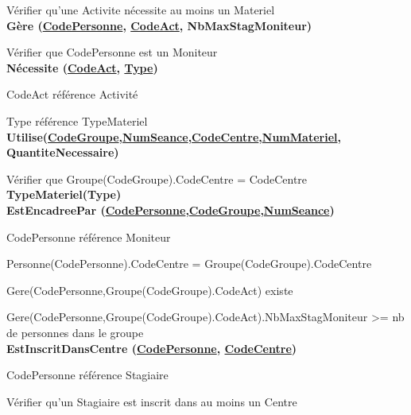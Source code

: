 \documentclass[10pt]{article}
\begin{document}
\begin{small}
    \hspace{1cm}Vérifier qu’une Activite nécessite au moins un Materiel\\   

\textbf{Gère (\underline{CodePersonne}, \underline{CodeAct}, NbMaxStagMoniteur)}

\hspace{1cm}Vérifier que CodePersonne est un Moniteur\\

\textbf{Nécessite (\underline{CodeAct}, \underline{Type})}

    \hspace{1cm}CodeAct référence Activité
    
    \hspace{1cm}Type référence TypeMateriel\\

\textbf{Utilise(\underline{CodeGroupe},\underline{NumSeance},\underline{CodeCentre},\underline{NumMateriel}, QuantiteNecessaire)}
    
    \hspace{1cm}Vérifier que Groupe(CodeGroupe).CodeCentre = CodeCentre\\

\textbf{TypeMateriel(Type)}\\

\textbf{EstEncadreePar (\underline{CodePersonne},\underline{CodeGroupe},\underline{NumSeance})}

    \hspace{1cm}CodePersonne référence Moniteur
    
    \hspace{1cm}Personne(CodePersonne).CodeCentre = Groupe(CodeGroupe).CodeCentre
    
    \hspace{1cm}Gere(CodePersonne,Groupe(CodeGroupe).CodeAct) existe
    
    \hspace{1cm}Gere(CodePersonne,Groupe(CodeGroupe).CodeAct).NbMaxStagMoniteur >= nb de personnes dans le groupe\\

\textbf{EstInscritDansCentre (\underline{CodePersonne}, \underline{CodeCentre})}
    
    \hspace{1cm}CodePersonne référence Stagiaire
    
    \hspace{1cm}Vérifier qu’un Stagiaire est inscrit dans au moins un Centre\\
    
\end{small}
\end{document}
